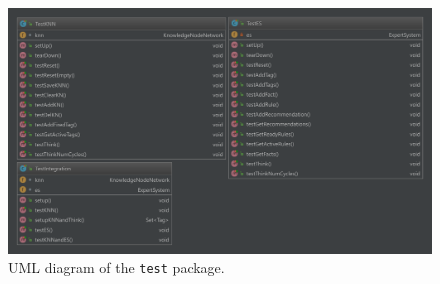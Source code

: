 \documentclass[titlepage,11pt]{article}
\newcommand{\code}[1]{\texttt{#1}}
\begin{document}
\begin{figure}[!htb]
	\centering
	\includegraphics[width=\columnwidth]{figures/uml_test.pdf}
	\caption{UML diagram of the \code{test} package.}
	\label{uml_test}
\end{figure}

\clearpage

{}

\end{document}
